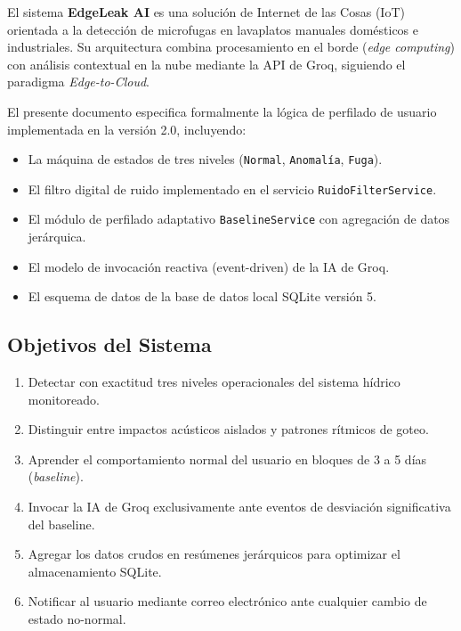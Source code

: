 \documentclass[12pt,a4paper]{article}
\begin{document}
El sistema \textbf{EdgeLeak AI} es una solución de Internet de las Cosas (IoT) orientada a la detección de microfugas en lavaplatos manuales domésticos e industriales. Su arquitectura combina procesamiento en el borde (\textit{edge computing}) con análisis contextual en la nube mediante la API de Groq, siguiendo el paradigma \textit{Edge-to-Cloud}.

El presente documento especifica formalmente la lógica de perfilado de usuario implementada en la versión 2.0, incluyendo:

\begin{itemize}[noitemsep]
    \item La máquina de estados de tres niveles (\texttt{Normal}, \texttt{Anomalía}, \texttt{Fuga}).
    \item El filtro digital de ruido implementado en el servicio \texttt{RuidoFilterService}.
    \item El módulo de perfilado adaptativo \texttt{BaselineService} con agregación de datos jerárquica.
    \item El modelo de invocación reactiva (event-driven) de la IA de Groq.
    \item El esquema de datos de la base de datos local SQLite versión 5.
\end{itemize}

\subsection{Objetivos del Sistema}

\begin{enumerate}[noitemsep]
    \item Detectar con exactitud tres niveles operacionales del sistema hídrico monitoreado.
    \item Distinguir entre impactos acústicos aislados y patrones rítmicos de goteo.
    \item Aprender el comportamiento normal del usuario en bloques de 3 a 5 días (\textit{baseline}).
    \item Invocar la IA de Groq exclusivamente ante eventos de desviación significativa del baseline.
    \item Agregar los datos crudos en resúmenes jerárquicos para optimizar el almacenamiento SQLite.
    \item Notificar al usuario mediante correo electrónico ante cualquier cambio de estado no-normal.
\end{enumerate}

\end{document}
